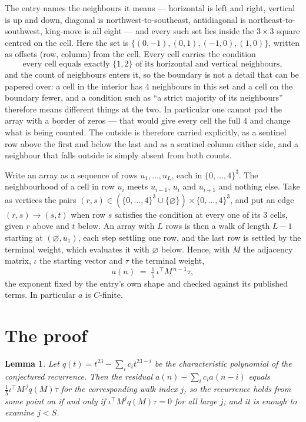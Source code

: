 \documentclass[11pt,a4paper]{article}
\theoremstyle{plain}
\newtheorem{lemma}[theorem]{Lemma}
\theoremstyle{definition}
\begin{document}
The entry names the neighbours it means --- horizontal is left and right, vertical is up and
down, diagonal is northwest-to-southeast, antidiagonal is northeast-to-southwest, king-move is
all eight --- and every such set lies inside the $3\times3$ square centred on the cell. Here
the set is $\{(0,-1), (0,1), (-1,0), (1,0)\}$, written as offsets (row, column) from the cell. Every cell carries
the condition
\[
\text{every cell equals exactly }\{1,2\}\text{ of its horizontal and vertical neighbours},
\]
and the count of neighbours enters it, so the boundary is not a detail that can be papered
over: a cell in the interior has $4$ neighbours in this set and a cell on the boundary
fewer, and a condition such as ``a strict majority of its neighbours'' therefore means
different things at the two. In particular one cannot pad the array with a border of zeros ---
that would give every cell the full $4$ and change what is being counted. The outside is
therefore carried
explicitly, as a sentinel row above the first and below the last and as a sentinel column
either side, and a neighbour that falls outside is simply absent from both counts.

Write an array as a sequence of rows $u_1,\dots,u_L$, each in
$\{0,\dots,4\}^{3}$. The neighbourhood of a cell in row $u_i$ meets $u_{i-1}$,
$u_i$ and $u_{i+1}$ and nothing else. Take as vertices the pairs
$(r,s)\in(\{0,\dots,4\}^{3}\cup\{\varnothing\})\times\{0,\dots,4\}^{3}$,
and put an edge $(r,s)\to(s,t)$ when row $s$ satisfies the condition at every one of its
$3$ cells, given $r$ above and $t$ below. An array with $L$ rows is then a walk of length
$L-1$ starting at $(\varnothing,u_1)$, each step settling one row, and the last row is
settled by the terminal weight, which evaluates it with $\varnothing$ below. Hence,
with $M$ the adjacency matrix, $\iota$ the starting vector and $\tau$ the terminal weight,
\[
a(n)\;=\;\tfrac1{5}\,\iota^{\!\top}M^{\,n-1}\tau ,
\]
the exponent fixed by the entry's own shape and checked against its published terms. In
particular $a$ is $C$-finite.

\section{The proof}

\begin{lemma}\label{lem:crit}
Let $q(t)=t^{23}-\sum_i c_it^{23-i}$ be the characteristic polynomial of the
conjectured recurrence. Then the residual $a(n)-\sum_ic_ia(n-i)$ equals
$\tfrac1{5}\iota^{\!\top}M^{\,j}q(M)\tau$ for the corresponding walk index $j$, so the
recurrence holds from some point on if and only if $\iota^{\!\top}M^{j}q(M)\tau=0$ for all
large $j$; and it is enough to examine $j<S$.
\end{lemma}
\end{document}

